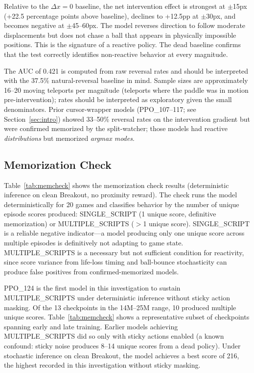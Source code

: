 \documentclass[11pt]{article}
\begin{document}
Relative to the $\Delta x=0$ baseline, the net intervention effect is strongest
at $\pm$15px (+22.5 percentage points above baseline), declines to
+12.5pp at $\pm$30px, and becomes negative at $\pm$45--60px. The model
reverses direction to follow moderate displacements but does not chase a ball
that appears in physically impossible positions. This is the signature of a
reactive policy. The dead baseline confirms that the test correctly identifies
non-reactive behavior at every magnitude.

The AUC of 0.421 is computed from raw reversal rates and should be interpreted
with the 37.5\% natural-reversal baseline in mind. Sample sizes are
approximately 16--20 moving teleports per magnitude (teleports where the paddle
was in motion pre-intervention); rates should be interpreted as exploratory
given the small denominators. Prior cursor-wrapper models (PPO\_107--117;
see Section~\ref{sec:intro})
showed 33--50\% reversal rates on the intervention gradient but were confirmed
memorized by the split-watcher; those models had reactive \emph{distributions}
but memorized \emph{argmax modes}.

\subsection{Memorization Check}

Table~\ref{tab:memcheck} shows the memorization check results (deterministic
inference on clean Breakout, no proximity reward). The check runs the model
deterministically for 20 games and classifies behavior by the number of
unique episode scores produced: SINGLE\_SCRIPT (1 unique score, definitive
memorization) or MULTIPLE\_SCRIPTS ($>$1 unique score). SINGLE\_SCRIPT is a
reliable negative indicator---a model producing only one unique score across
multiple episodes is definitively not adapting to game state.
MULTIPLE\_SCRIPTS is a necessary but not sufficient condition for reactivity,
since score variance from life-loss timing and ball-bounce stochasticity can
produce false positives from confirmed-memorized models.

PPO\_124 is the first model in this investigation to sustain MULTIPLE\_SCRIPTS
under deterministic inference without sticky action masking. Of the 13
checkpoints in the 14M--25M range, 10 produced multiple unique scores.
Table~\ref{tab:memcheck} shows a representative subset of checkpoints spanning
early and late training. Earlier models achieving MULTIPLE\_SCRIPTS did so
only with sticky actions enabled (a known confound: sticky noise produces 8--14
unique scores from a dead policy). Under stochastic inference on clean Breakout,
the model achieves a best score of 216, the highest recorded in this
investigation without sticky masking.
\end{document}
